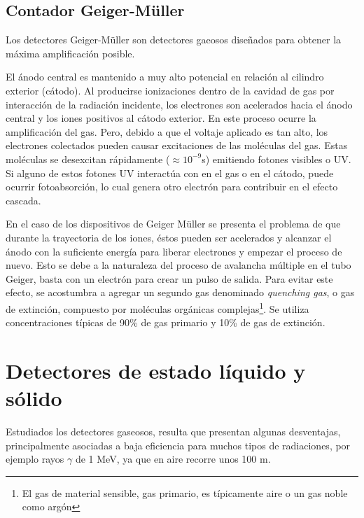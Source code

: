 \subsection{Contador Geiger-M\"uller}
\label{CapIII_8}

Los detectores Geiger-M\"uller son detectores gaeosos dise\~nados para obtener la m\'axima amplificaci\'on posible.

El \'anodo central es mantenido a muy alto potencial en relaci\'on al cilindro exterior (c\'atodo). Al producirse ionizaciones dentro de la cavidad de gas por 
interacci\'on de la radiaci\'on incidente, los electrones son acelerados hacia el \'anodo central y los iones positivos al c\'atodo exterior. En este proceso 
ocurre la amplificaci\'on del gas. Pero, debido a que el voltaje aplicado es tan alto, los electrones colectados pueden causar excitaciones de las mol\'eculas 
del gas. Estas mol\'eculas se desexcitan r\'apidamente ($\approx 10^{-9}$s) emitiendo fotones visibles o UV. Si alguno de estos fotones UV interact\'ua con en 
el gas o en el c\'atodo, puede ocurrir fotoabsorci\'on, lo cual genera otro electr\'on para contribuir en el efecto cascada.
%

%
En el caso de los dispositivos de Geiger M\"uller se presenta el problema de que durante la trayectoria de los iones, \'estos pueden ser 
acelerados y alcanzar el \'anodo con la suficiente energ\'ia para liberar electrones y empezar el proceso de nuevo. Esto se debe a 
la naturaleza del proceso de avalancha m\'ultiple en el tubo Geiger, basta con un electr\'on para crear un pulso de salida. Para evitar 
este efecto, se acostumbra a agregar un segundo gas denominado \textit{quenching gas}, o gas de extinci\'on, compuesto por mol\'eculas 
org\'anicas complejas\footnote{El gas de  material sensible, gas primario, es t\'ipicamente aire o un gas noble como arg\'on}.
Se utiliza concentraciones t\'ipicas de 90\% de gas primario y 10\% de gas de extinci\'on.


\section{Detectores de estado l\'iquido y s\'olido}
\label{CapIII_9}

Estudiados los detectores gaseosos, resulta que presentan algunas desventajas, principalmente asociadas a baja eficiencia para muchos tipos 
de radiaciones, por ejemplo rayos $\gamma$ de 1 MeV, ya que en aire recorre unos 100 m.
%


